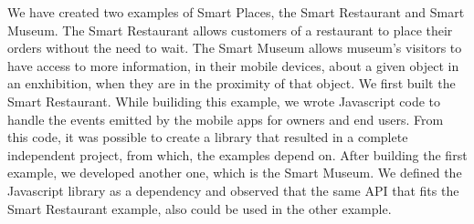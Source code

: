 We have created two examples of Smart Places, the Smart Restaurant and Smart Museum.
The Smart Restaurant allows customers of a restaurant to place their orders without the need to wait.
The Smart Museum allows museum's visitors to have access to more information, in their mobile devices, about a given object in an enxhibition, when they are in the proximity of that object.
We first built the Smart Restaurant.
While builiding this example, we wrote Javascript code to handle the events emitted by the mobile apps for owners and end users.
From this code, it was possible to create a library that resulted in a complete independent project, from which, the examples depend on.
After building the first example, we developed another one, which is the Smart Museum.
We defined the Javascript library as a dependency and observed that the same \gls{API} that fits the Smart Restaurant example, also could be used in the other example.
